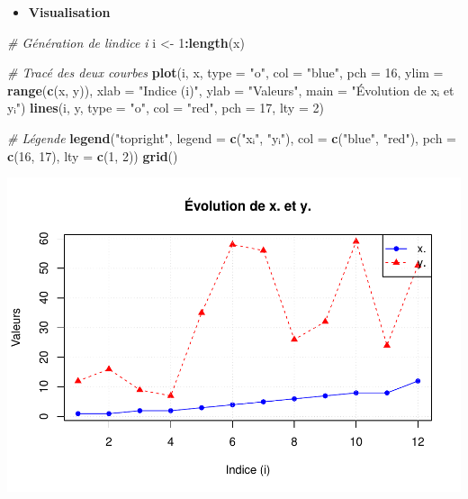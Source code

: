 \documentclass[
  12pt,
]{article}
\newenvironment{Shaded}{\begin{snugshade}}{\end{snugshade}}
\newcommand{\AttributeTok}[1]{\textcolor[rgb]{0.13,0.29,0.53}{#1}}
\newcommand{\CommentTok}[1]{\textcolor[rgb]{0.56,0.35,0.01}{\textit{#1}}}
\newcommand{\DecValTok}[1]{\textcolor[rgb]{0.00,0.00,0.81}{#1}}
\newcommand{\FunctionTok}[1]{\textcolor[rgb]{0.13,0.29,0.53}{\textbf{#1}}}
\newcommand{\NormalTok}[1]{#1}
\newcommand{\OtherTok}[1]{\textcolor[rgb]{0.56,0.35,0.01}{#1}}
\newcommand{\SpecialCharTok}[1]{\textcolor[rgb]{0.81,0.36,0.00}{\textbf{#1}}}
\newcommand{\StringTok}[1]{\textcolor[rgb]{0.31,0.60,0.02}{#1}}
\providecommand{\tightlist}{%
  \setlength{\itemsep}{0pt}\setlength{\parskip}{0pt}}
\begin{document}
\begin{itemize}
\tightlist
\item
  \textbf{Visualisation}
\end{itemize}

\begin{Shaded}
\begin{Highlighting}[]
\CommentTok{\# Génération de l\textquotesingle{}indice i}
\NormalTok{i }\OtherTok{\textless{}{-}} \DecValTok{1}\SpecialCharTok{:}\FunctionTok{length}\NormalTok{(x)}

\CommentTok{\# Tracé des deux courbes}
\FunctionTok{plot}\NormalTok{(i, x, }\AttributeTok{type =} \StringTok{"o"}\NormalTok{, }\AttributeTok{col =} \StringTok{"blue"}\NormalTok{, }\AttributeTok{pch =} \DecValTok{16}\NormalTok{, }\AttributeTok{ylim =} \FunctionTok{range}\NormalTok{(}\FunctionTok{c}\NormalTok{(x, y)),}
     \AttributeTok{xlab =} \StringTok{"Indice (i)"}\NormalTok{, }\AttributeTok{ylab =} \StringTok{"Valeurs"}\NormalTok{, }\AttributeTok{main =} \StringTok{"Évolution de xᵢ et yᵢ"}\NormalTok{)}
\FunctionTok{lines}\NormalTok{(i, y, }\AttributeTok{type =} \StringTok{"o"}\NormalTok{, }\AttributeTok{col =} \StringTok{"red"}\NormalTok{, }\AttributeTok{pch =} \DecValTok{17}\NormalTok{, }\AttributeTok{lty =} \DecValTok{2}\NormalTok{)}

\CommentTok{\# Légende}
\FunctionTok{legend}\NormalTok{(}\StringTok{"topright"}\NormalTok{, }\AttributeTok{legend =} \FunctionTok{c}\NormalTok{(}\StringTok{"xᵢ"}\NormalTok{, }\StringTok{"yᵢ"}\NormalTok{),}
       \AttributeTok{col =} \FunctionTok{c}\NormalTok{(}\StringTok{"blue"}\NormalTok{, }\StringTok{"red"}\NormalTok{), }\AttributeTok{pch =} \FunctionTok{c}\NormalTok{(}\DecValTok{16}\NormalTok{, }\DecValTok{17}\NormalTok{), }\AttributeTok{lty =} \FunctionTok{c}\NormalTok{(}\DecValTok{1}\NormalTok{, }\DecValTok{2}\NormalTok{))}
\FunctionTok{grid}\NormalTok{()}
\end{Highlighting}
\end{Shaded}

\includegraphics{Stat_non_para_files/figure-latex/unnamed-chunk-62-1.pdf}
\end{document}
